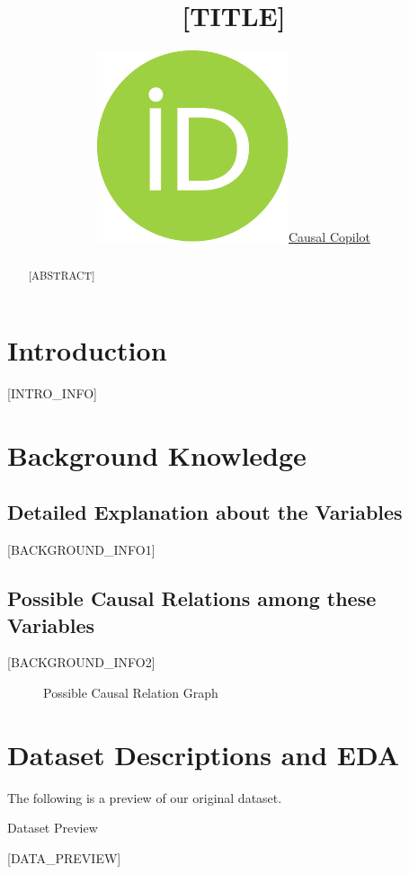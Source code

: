 \documentclass{article}
\title{[TITLE]}
\author{ \href{https://orcid.org/0000-0000-0000-0000}{\includegraphics[scale=0.06]{postprocess/context/orcid.pdf}\hspace{1mm}Causal Copilot}}
\begin{document}
\maketitle

\begin{abstract}
[ABSTRACT]
\end{abstract}


\raggedbottom
\section{Introduction}
[INTRO_INFO]

\section{Background Knowledge}
\subsection{Detailed Explanation about the Variables}
[BACKGROUND_INFO1]

\subsection{Possible Causal Relations among these Variables}

\begin{minipage}[t]{0.7\linewidth}
    [BACKGROUND_INFO2]
\vfill
\end{minipage}
\hspace{0.05\textwidth}
\begin{minipage}[t]{0.3\linewidth}
    \begin{figure}[H]
        \centering
        \vspace{-0.5cm}
        \caption{\label{fig:relation}Possible Causal Relation Graph}
    \end{figure}
\end{minipage}


\section{Dataset Descriptions and EDA}
The following is a preview of our original dataset.

\begin{table}[H]
    \centering
    \caption{Dataset Preview}
    [DATA_PREVIEW]
\end{table}
\end{document}
